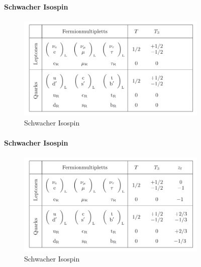 \begin{nframe}
	\framesubtitle{Schwacher Isospin}
	\begin{figure}
		\includegraphics[height=5cm]{img/isospin3}
		\caption*{Schwacher Isospin\cite{povh}}
	\end{figure}
\end{nframe}
\notes

\begin{nframe}
	\framesubtitle{Schwacher Isospin}
	\begin{figure}
		\includegraphics[height=5cm]{img/isospin}
		\caption*{Schwacher Isospin\cite{povh}}
	\end{figure}
\end{nframe}
\notes

